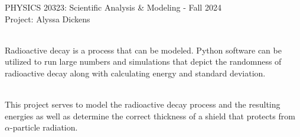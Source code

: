 \documentclass[12pt]{article}
\begin{document}
\def\pos{\medskip\quad}
\def\subpos{\smallskip \qquad}

\begin{center}
{\large
PHYSICS  20323: Scientific Analysis \& Modeling - Fall 2024
}\\
{\large Project: Alyssa Dickens}\\\vskip0.25in
\end{center}
 \\

Radioactive decay is a process that can be modeled. Python software can be utilized to run large \indent numbers and simulations that depict the randomness of radioactive decay along with calculating \indent energy and standard deviation.

\vskip0.1in
 \\

This project serves to model the radioactive decay process and the resulting energies as well as \indent determine the correct thickness of a shield that protects from $\alpha$-particle radiation. 

\end{document}
